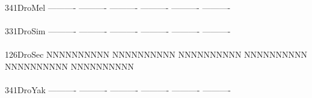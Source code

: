 \documentclass[11pt,twoside,reqno,a4paper]{article}
\begin{document}
{\\
341\hspace*{1\charwidth}DroMel	----------	----------	----------	----------	----------	----------	\\
\hspace*{4\charwidth}\hspace*{7\charwidth}\hspace*{1\charwidth}\hspace*{1\charwidth}\hspace*{1\charwidth}\hspace*{1\charwidth}\hspace*{1\charwidth}\hspace*{1\charwidth}\\
331\hspace*{1\charwidth}DroSim	----------	----------	----------	----------	----------	----------	\\
\hspace*{4\charwidth}\hspace*{7\charwidth}\hspace*{1\charwidth}\hspace*{1\charwidth}\hspace*{1\charwidth}\hspace*{1\charwidth}\hspace*{1\charwidth}\hspace*{1\charwidth}\\
126\hspace*{1\charwidth}DroSec	NNNNNNNNNN	NNNNNNNNNN	NNNNNNNNNN	NNNNNNNNNN	NNNNNNNNNN	NNNNNNNNNN	\\
\hspace*{4\charwidth}\hspace*{7\charwidth}\hspace*{1\charwidth}\hspace*{1\charwidth}\hspace*{1\charwidth}\hspace*{1\charwidth}\hspace*{1\charwidth}\hspace*{1\charwidth}\\
341\hspace*{1\charwidth}DroYak	----------	----------	----------	----------	----------	----------	\\
\hspace*{4\charwidth}\hspace*{7\charwidth}\hspace*{1\charwidth}\hspace*{1\charwidth}\hspace*{1\charwidth}\hspace*{1\charwidth}\hspace*{1\charwidth}\hspace*{1\charwidth}\\
}
\end{document}
